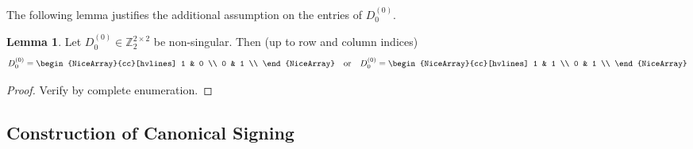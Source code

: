 \documentclass{article}
\theoremstyle{definition}
\newtheorem{lemma}[theorem]{Lemma}
\begin{document}
The following lemma justifies the additional assumption on the entries of $D_{0}^{(0)}$.

\begin{lemma}\label{lem:matrix_z2_2_2_rank_2}
    Let $D_{0}^{(0)} \in \mathbb{Z}_{2}^{2 \times 2}$ be non-singular. Then (up to row and column indices)
    \[
        D_{0}^{(0)} = \begin{NiceArray}{cc}[hvlines] 1 & 0 \\ 0 & 1 \\ \end{NiceArray}
        \quad \text{or} \quad
        D_{0}^{(0)} = \begin{NiceArray}{cc}[hvlines] 1 & 1 \\ 0 & 1 \\ \end{NiceArray}
    \]
\end{lemma}

\begin{proof}
    Verify by complete enumeration.
\end{proof}

\subsection{Construction of Canonical Signing}
\end{document}
